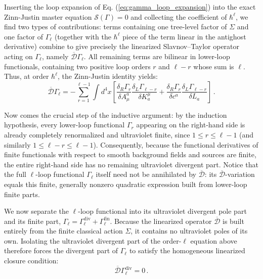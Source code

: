 Inserting the loop expansion of Eq. (\ref{eq:gamma_loop_expansion}) into the exact Zinn-Justin master equation \(\mathcal{S}(\Gamma) = 0\) and collecting the coefficient of \(\hbar^\ell\), we find two types of contributions: terms containing one tree-level factor of \(\Sigma\) and one factor of \(\Gamma_\ell\) (together with the \(\hbar^\ell\) piece of the term linear in the antighost derivative) combine to give precisely the linearized Slavnov--Taylor operator acting on \(\Gamma_\ell\), namely \(\overline{\mathcal{D}}\Gamma_\ell\). All remaining terms are bilinear in lower-loop functionals, containing two positive loop orders \(r\) and \(\ell - r\) whose sum is \(\ell\). Thus, at order \(\hbar^\ell\), the Zinn-Justin identity yields:
\[
    \overline{\mathcal{D}}\Gamma_\ell = -\sum_{r=1}^{\ell-1} \int d^4x \left[ \frac{\delta_R \Gamma_r}{\delta A_\mu^a} \frac{\delta_L \Gamma_{\ell - r}}{\delta K_a^\mu} + \frac{\delta_R \Gamma_r}{\delta c^a} \frac{\delta_L \Gamma_{\ell - r}}{\delta L_a} \right] \, .
\]

Now comes the crucial step of the inductive argument: by the induction hypothesis, every lower-loop functional \(\Gamma_r\) appearing on the right-hand side is already completely renormalized and ultraviolet finite, since \(1 \le r \le \ell - 1\) (and similarly \(1 \le \ell - r \le \ell - 1\)). Consequently, because the functional derivatives of finite functionals with respect to smooth background fields and sources are finite, the entire right-hand side has no remaining ultraviolet divergent part. Notice that the full \(\ell\)-loop functional \(\Gamma_\ell\) itself need not be annihilated by \(\overline{\mathcal{D}}\): its \(\overline{\mathcal{D}}\)-variation equals this finite, generally nonzero quadratic expression built from lower-loop finite parts.

We now separate the \(\ell\)-loop functional into its ultraviolet divergent pole part and its finite part, \(\Gamma_\ell = \Gamma_\ell^{\text{div}} + \Gamma_\ell^{\text{fin}}\). Because the linearized operator \(\overline{\mathcal{D}}\) is built entirely from the finite classical action \(\Sigma\), it contains no ultraviolet poles of its own. Isolating the ultraviolet divergent part of the order-\(\ell\) equation above therefore forces the divergent part of \(\Gamma_\ell\) to satisfy the homogeneous linearized closure condition:
\begin{equation} \label{eq:d_bar_gamma_div_closed}
    \overline{\mathcal{D}}\Gamma_\ell^{\text{div}} = 0 \, .
\end{equation}

